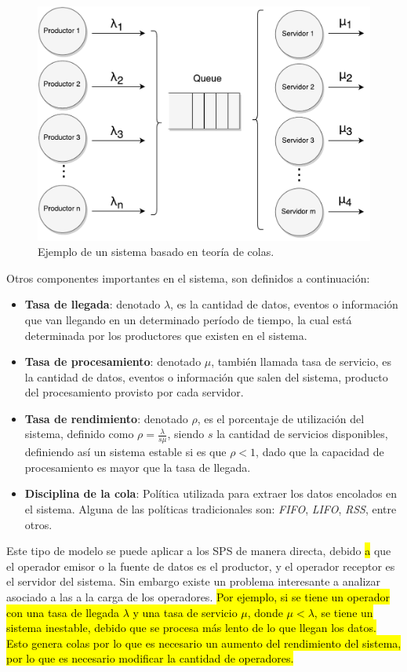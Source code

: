 \begin{figure}[!ht]
	\centering
	\includegraphics[scale=0.6]{images/TeoriaColas.pdf}
	\caption{Ejemplo de un sistema basado en teoría de colas.}
	\label{fig:teoriaColas}
\end{figure}

Otros componentes importantes en el sistema, son definidos a continuación:
\begin{itemize}
	\item \textbf{Tasa de llegada}: denotado $\lambda$, es la cantidad de datos, eventos o información que van llegando en un determinado período de tiempo, la cual está determinada por los productores que existen en el sistema.
	\item \textbf{Tasa de procesamiento}: denotado $\mu$, también llamada tasa de servicio, es la cantidad de datos, eventos o información que salen del sistema, producto del procesamiento provisto por cada servidor.
	\item \textbf{Tasa de rendimiento}: denotado $\rho$, es el porcentaje de utilización del sistema, definido como $\rho = \frac{\lambda}{s\mu}$, siendo $s$ la cantidad de servicios disponibles, definiendo así un sistema estable si es que $\rho < 1$, dado que la capacidad de procesamiento es mayor que la tasa de llegada.
	\item \textbf{Disciplina de la cola}: Política utilizada para extraer los datos encolados en el sistema. Alguna de las políticas tradicionales son: \textit{FIFO}, \textit{LIFO}, \textit{RSS}, entre otros.
\end{itemize}

Este tipo de modelo se puede aplicar a los SPS de manera directa, debido \hl{a} que el operador emisor o la fuente de datos es el productor, y el operador receptor es el servidor del sistema. Sin embargo existe un problema interesante a analizar asociado a las a la carga de los operadores. \hl{Por ejemplo, si se tiene un operador con una tasa de llegada $\lambda$ y una tasa de servicio $\mu$, donde $\mu < \lambda$, se tiene un sistema inestable, debido que se procesa más lento de lo que llegan los datos. Esto genera colas por lo que es necesario un aumento del rendimiento del sistema, por lo que es necesario modificar la cantidad de operadores.}
